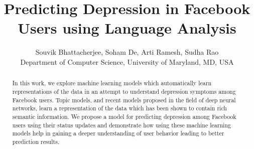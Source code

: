 \documentclass[11pt]{article}
\title{Predicting Depression in Facebook Users using Language Analysis}
\author{Souvik Bhattacherjee, Soham De, Arti Ramesh, Sudha Rao \\ Department of Computer Science, University of Maryland, MD, USA\\
}
\date{}
\begin{document}
\maketitle
\begin{abstract}
In this work, we explore machine learning models which automatically learn representations of the data in an attempt to understand depression symptoms among Facebook users. Topic models, and recent models proposed in the field of deep neural networks, learn a representation of the data which has been shown to contain rich semantic information.
We propose a model for predicting depression among Facebook users using their status updates %
and demonstrate how using these machine learning models help in gaining a deeper understanding of user behavior leading to better prediction results.
\end{abstract}














%
%
%
%
%
\end{document}

